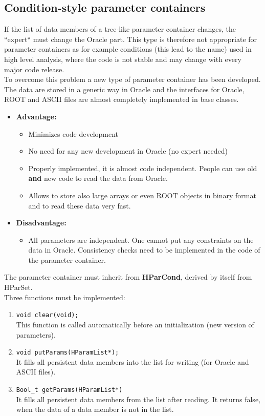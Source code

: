 \subsection[Condition-style parameter containers]{Condition-style parameter containers} \label{sec:rtdbCondStyleParamCont}
If the list of data members of a tree-like parameter container changes, the ``expert`` must change the Oracle part.
This type is therefore not appropriate for parameter containers as for example conditions (this lead to the name) used 
in high level analysis, where the code is not stable and may change with every major code release.\\

To overcome this problem a new type of parameter container has been developed. The data are stored in a generic way 
in Oracle and the interfaces for Oracle, ROOT  and ASCII files are almost completely implemented in base classes.
\begin{itemize}
  \item \textbf{Advantage:}
    \begin{itemize}
      \item Minimizes code development
      \item No need for any new development in Oracle (no expert needed)
      \item Properly implemented, it is almost code independent. People can use old \textbf{and} new code to read the 
            data from Oracle.
      \item Allows to store also large arrays or even ROOT objects in binary format and to read these data very fast.
    \end{itemize}
  \item \textbf{Disadvantage:}
    \begin{itemize}
      \item All parameters are independent. One cannot put any constraints on the data in Oracle. Consistency checks
            need to be implemented in the code of the parameter container.
    \end{itemize}
\end{itemize}

The parameter container must inherit from \textbf{HParCond}, derived by itself from HParSet.\\
Three functions must be implemented:
\begin{enumerate}
 \item \verb+void clear(void);+\\
       This function is called automatically before an initialization (new version of parameters). 
 \item \verb+void putParams(HParamList*);+\\
       It fills all persistent data members into the list for writing (for Oracle and ASCII files).                                                   
 \item \verb+Bool_t getParams(HParamList*)+\\
       It fills all persistent data members from the list after reading. It returns false, when the data of a data member 
       is not in the list.
\end{enumerate}

